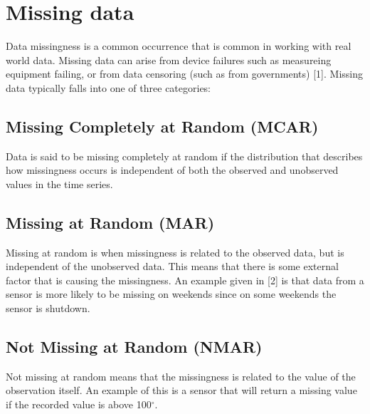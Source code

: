 \documentclass[
]{report}
\begin{document}
\hypertarget{missing-data}{%
\section{Missing data}\label{missing-data}}


Data missingness is a common occurrence that is common in working with
real world data. Missing data can arise from device failures such as
measureing equipment failing, or from data censoring (such as from
governments) {[}1{]}. Missing data typically falls into one of three
categories:

\hypertarget{missing-completely-at-random-mcar}{%
\subsection{Missing Completely at Random
(MCAR)}\label{missing-completely-at-random-mcar}}

Data is said to be missing completely at random if the distribution that
describes how missingness occurs is independent of both the observed and
unobserved values in the time series.

\hypertarget{missing-at-random-mar}{%
\subsection{Missing at Random (MAR)}\label{missing-at-random-mar}}

Missing at random is when missingness is related to the observed data,
but is independent of the unobserved data. This means that there is some
external factor that is causing the missingness. An example given in
{[}2{]} is that data from a sensor is more likely to be missing on
weekends since on some weekends the sensor is shutdown.

\hypertarget{not-missing-at-random-nmar}{%
\subsection{Not Missing at Random
(NMAR)}\label{not-missing-at-random-nmar}}

Not missing at random means that the missingness is related to the value
of the observation itself. An example of this is a sensor that will
return a missing value if the recorded value is above 100\(^\circ\).

\end{document}
